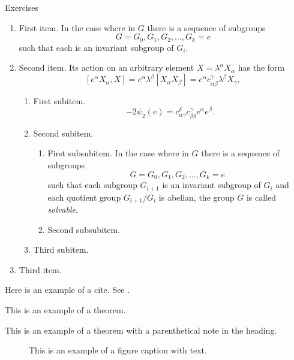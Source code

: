 \begin{xcb}{Exercises}
\begin{enumerate}
\item First item.
In the case where in $G$ there is a sequence of subgroups
\[
G = G_0, G_1, G_2, \dots, G_k = e
\]
such that each is an invariant subgroup of $G_i$.

\item Second item.
Its action on an arbitrary element $X = \lambda^\alpha X_\alpha$ has the
form
\begin{equation}\label{eq:action}
[e^\alpha X_\alpha, X] = e^\alpha \lambda^\beta
[X_\alpha X_\beta] = e^\alpha c^\gamma_{\alpha \beta}
 \lambda^\beta X_\gamma,
\end{equation}

\begin{enumerate}
\item First subitem.
\[
- 2\psi_2(e) =  c_{\alpha \gamma}^\delta c_{\beta \delta}^\gamma
e^\alpha e^\beta.
\]

\item Second subitem.
\begin{enumerate}
\item First subsubitem.
In the case where in $G$ there is a sequence of subgroups
\[
G = G_0, G_1, G_2, \ldots, G_k = e
\]
such that each subgroup $G_{i+1}$ is an invariant subgroup of $G_i$ and
each quotient group $G_{i+1}/G_{i}$ is abelian, the group $G$ is called
\textit{solvable}.

\item Second subsubitem.
\end{enumerate}
\item Third subitem.
\end{enumerate}
\item Third item.
\end{enumerate}
\end{xcb}

Here is an example of a cite. See \cite{A}.

\begin{theorem}
This is an example of a theorem.
\end{theorem}

\begin{theorem}
This is an example of a theorem with a parenthetical note in the
heading.
\end{theorem}

\begin{figure}[tb]
\caption{This is an example of a figure caption with text.}
\label{firstfig}
\end{figure}

